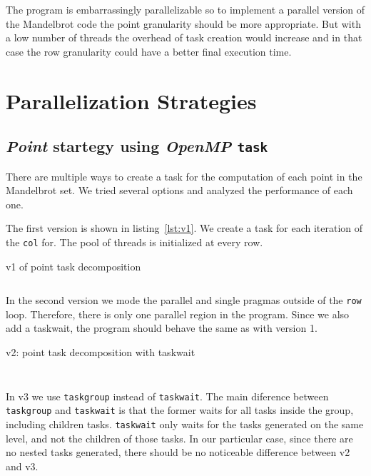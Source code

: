 The program is embarrassingly parallelizable so to implement a parallel version of the Mandelbrot code the point granularity should be more appropriate. But with a low number of threads the overhead of task creation would increase and in that case the row granularity could have a better final execution time.

\section{Parallelization Strategies}%
\label{sec:Parallelization Strategies}


\subsection{\emph{Point} startegy using \emph{OpenMP} \texttt{task}}%

There are multiple ways to create a task for the computation of each point in the Mandelbrot set. We tried
several options and analyzed the performance of each one.

The first version is shown in listing~\ref{lst:v1}. We create a task for each iteration of the \texttt{col} for. The
pool of threads is initialized at every row.

\begin{listing}[H]
    \caption{v1 of point task decomposition}
    \inputminted[firstline=91,lastline=98]{c}{sources/mandel-omp-v1.c}
    \label{lst:v1} 
\end{listing}

In the second version we mode the parallel and single pragmas outside of the \texttt{row} loop. Therefore, there
is only one parallel region in the program. Since we also add a taskwait, the program should behave the same as with
version 1. 

\begin{listing}[H]
    \centering
    \caption{v2: point task decomposition with taskwait}
    \inputminted[firstline=91,lastline=98]{c}{sources/mandel-omp-v2.c}
    \vspace{-2em}
    \inputminted[firstline=132,lastline=134]{c}{sources/mandel-omp-v2.c}
    \label{lst:v2} 
\end{listing}

In v3 we use \texttt{taskgroup} instead of \texttt{taskwait}. The main diference between \texttt{taskgroup}
and \texttt{taskwait} is that the former waits for all tasks inside the group, including children tasks.
\texttt{taskwait} only waits for the tasks generated on the same level, and not the children of those tasks.
In our particular case, since there are no nested tasks generated, there should be no noticeable 
difference between v2 and v3.

